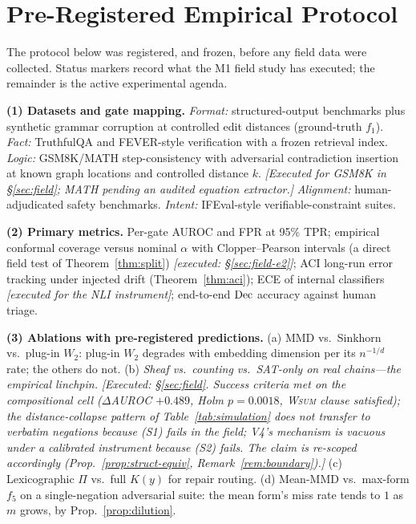 \section{Pre-Registered Empirical Protocol}
\label{sec:protocol}

The protocol below was registered, and frozen, before any field data were
collected. Status markers record what the M1 field study has executed; the
remainder is the active experimental agenda.

\textbf{(1) Datasets and gate mapping.} \emph{Format:} structured-output
benchmarks plus synthetic grammar corruption at controlled edit distances
(ground-truth $f_1$). \emph{Fact:} TruthfulQA \cite{lin2022} and FEVER-style verification
with a frozen retrieval index. \emph{Logic:} GSM8K/MATH step-consistency with
adversarial contradiction insertion at known graph locations and controlled
distance $k$. \emph{[Executed for GSM8K in \S\ref{sec:field}; MATH pending an
audited equation extractor.]} \emph{Alignment:} human-adjudicated safety
benchmarks. \emph{Intent:} IFEval-style verifiable-constraint suites.

\textbf{(2) Primary metrics.} Per-gate AUROC and FPR at 95\% TPR; empirical
conformal coverage versus nominal $\alpha$ with Clopper--Pearson intervals (a
direct field test of Theorem~\ref{thm:split}) \emph{[executed:
\S\ref{sec:field-e2}]}; ACI long-run error tracking under injected drift
(Theorem~\ref{thm:aci}); ECE of internal classifiers \emph{[executed for the
NLI instrument]}; end-to-end $\mathrm{Dec}$ accuracy against human triage.

\textbf{(3) Ablations with pre-registered predictions.}
(a) MMD vs.\ Sinkhorn vs.\ plug-in $W_2$: plug-in $W_2$ degrades with
embedding dimension per its $n^{-1/d}$ rate; the others do not.
(b) \emph{Sheaf vs.\ counting vs.\ SAT-only on real chains---the empirical
linchpin.} \emph{[Executed: \S\ref{sec:field}. Success criteria met on the
compositional cell (\(\Delta\)AUROC $+0.489$, Holm $p=0.0018$, \textsc{Wsum}
clause satisfied); the distance-collapse pattern of
Table~\ref{tab:simulation} does not transfer to verbatim negations because
(S1) fails in the field; V4's mechanism is vacuous under a calibrated
instrument because (S2) fails. The claim is re-scoped accordingly
(Prop.~\ref{prop:struct-equiv}, Remark~\ref{rem:boundary}).]}
(c) Lexicographic $\Pi$ vs.\ full $K(y)$ for repair routing.
(d) Mean-MMD vs.\ max-form $f_5$ on a single-negation adversarial suite: the
mean form's miss rate tends to $1$ as $m$ grows, by
Prop.~\ref{prop:dilution}.

